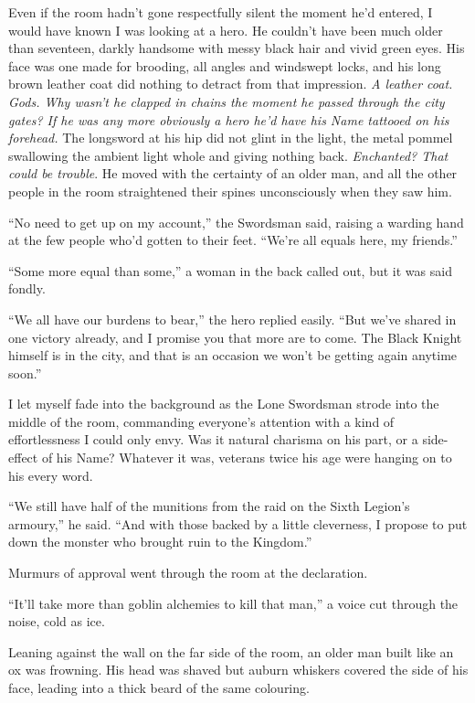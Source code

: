 \documentclass[12pt, openany]{book}
\begin{document}
Even if the room hadn’t gone respectfully silent the moment he’d entered, I would have known I was looking at a hero. He couldn’t have been much older than seventeen, darkly handsome with messy black hair and vivid green eyes. His face was one made for brooding, all angles and windswept locks, and his long brown leather coat did nothing to detract from that impression. \textit{A leather coat. Gods. Why wasn’t he clapped in chains the moment he passed through the city gates? If he was any more obviously a hero he’d have his Name tattooed on his forehead. }The longsword at his hip did not glint in the light, the metal pommel swallowing the ambient light whole and giving nothing back. \textit{Enchanted? That could be trouble}. He moved with the certainty of an older man, and all the other people in the room straightened their spines unconsciously when they saw him.

“No need to get up on my account,” the Swordsman said, raising a warding hand at the few people who’d gotten to their feet. “We’re all equals here, my friends.”

“Some more equal than some,” a woman in the back called out, but it was said fondly.

“We all have our burdens to bear,” the hero replied easily. “But we’ve shared in one victory already, and I promise you that more are to come. The Black Knight himself is in the city, and that is an occasion we won’t be getting again anytime soon.”

I let myself fade into the background as the Lone Swordsman strode into the middle of the room, commanding everyone’s attention with a kind of effortlessness I could only envy. Was it natural charisma on his part, or a side-effect of his Name? Whatever it was, veterans twice his age were hanging on to his every word.

“We still have half of the munitions from the raid on the Sixth Legion’s armoury,” he said. “And with those backed by a little cleverness, I propose to put down the monster who brought ruin to the Kingdom.”

Murmurs of approval went through the room at the declaration.

“It’ll take more than goblin alchemies to kill that man,” a voice cut through the noise, cold as ice.

Leaning against the wall on the far side of the room, an older man built like an ox was frowning. His head was shaved but auburn whiskers covered the side of his face, leading into a thick beard of the same colouring. 
\end{document}
